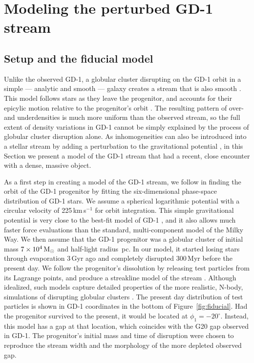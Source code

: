 \documentclass[twocolumn]{aastex62}
\begin{document}
\section{Modeling the perturbed GD-1 stream}
\subsection{Setup and the fiducial model}
\label{sec:model}
Unlike the observed GD-1, a globular cluster disrupting on the GD-1 orbit in a simple --- analytic and smooth --- galaxy creates a stream that is also smooth \citep{pwb}.
This model follows stars as they leave the progenitor, and accounts for their epicylic motion relative to the progenitor's orbit \citep{kupper2008, kupper2010, fardal2015}.
The resulting pattern of over- and underdensities is much more uniform than the observed stream, so the full extent of density variations in GD-1 cannot be simply explained by the process of globular cluster disruption alone.
As inhomogeneities can also be introduced into a stellar stream by adding a perturbation to the gravitational potential \citep[e.g.,][]{sgv2008}, in this Section we present a model of the GD-1 stream that had a recent, close encounter with a dense, massive object.

As a first step in creating a model of the GD-1 stream, we follow \citet{pwb} in finding the orbit of the GD-1 progenitor by fitting the six-dimensional phase-space distribution of GD-1 stars.
We assume a spherical logarithmic potential with a circular velocity of 225\,km\,s$^{-1}$ for orbit integration.
This simple gravitational potential is very close to the best-fit model of GD-1 \citep{koposov2010, bowden2015}, and it also allows much faster force evaluations than the standard, multi-component model of the Milky Way.
We then assume that the GD-1 progenitor was a globular cluster of initial mass $7\times10^4\rm\,M_\odot$ and half-light radius \,pc.
In our model, it started losing stars through evaporation 3\,Gyr ago and completely disrupted 300\,Myr before the present day.
We follow the progenitor's dissolution by releasing test particles from its Lagrange points, and produce a streakline model of the stream \citep{fardal2015}.
Although idealized, such models capture detailed properties of the more realistic, N-body, simulations of disrupting globular clusters \citep{kupper2012}.
The present day distribution of test particles is shown in GD-1 coordinates in the bottom of Figure~\ref{fig:fiducial}.
Had the progenitor survived to the present, it would be located at $\phi_1=-20^\circ$.
Instead, this model has a gap at that location, which coincides with the G20 gap observed in GD-1.
The progenitor's initial mass and time of disruption were chosen to reproduce the stream width and the morphology of the more depleted observed gap.
\end{document}
